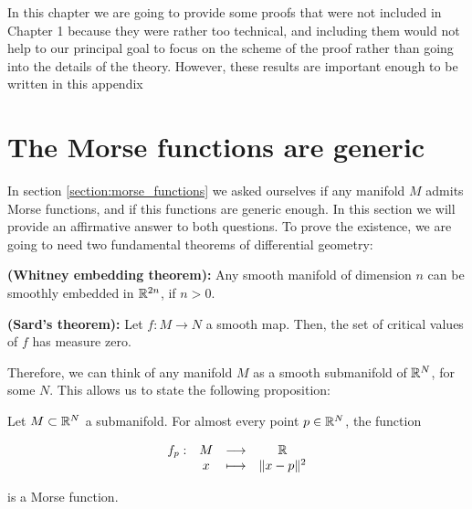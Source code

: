 In this chapter we are going to provide some proofs that were not included in Chapter 1 because they were rather too technical, and including them would not help to our principal goal to focus on the scheme of the proof rather than going into the details of the theory. However, these results are important enough to be written in this appendix

\section{The Morse functions are generic}

In section \ref{section:morse_functions} we asked ourselves if any manifold $M$ admits Morse functions, and if this functions are generic enough. In this section we will provide an affirmative answer to both questions. To prove the existence, we are going to need two fundamental theorems of differential geometry:

\begin{theo}
{\bf (Whitney embedding theorem):} Any smooth manifold of dimension $n$ can be smoothly embedded in $\mathbb{R}^{2n}$, if $n > 0$.
\end{theo}

\begin{theo}
{\bf (Sard's theorem):} Let $f : M \rightarrow N$ a smooth map. Then, the set of critical values of $f$ has measure zero.
\end{theo}

Therefore, we can think of any manifold $M$ as a smooth submanifold of $\mathbb{R}^N$, for some $N$. This allows us to state the following proposition:

\begin{prop} \label{existenceMorse}
Let $M \subset \mathbb{R}^N$ a submanifold. For almost every point $p \in \mathbb{R}^N$, the function

\begin{displaymath}
	\begin{array}{rccc}f_p : & M & \longrightarrow & \mathbb{R} \\ & x & \longmapsto & \|x-p\|^2 \end{array}
\end{displaymath}

is a Morse function.
\end{prop}

